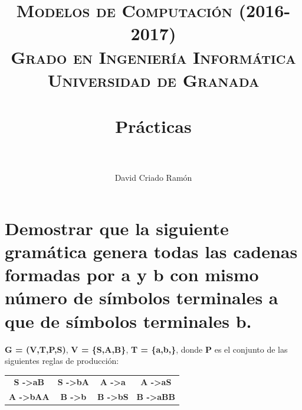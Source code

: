 



\title{	
\normalfont \normalsize 
\textsc{\textbf{Modelos de Computación (2016-2017)} \\ Grado en Ingeniería Informática \\ Universidad de Granada} \\ [25pt] %
\horrule{0.5pt} \\[0.4cm] %
\huge Prácticas \\ %
\horrule{2pt} \\[0.5cm] %
}

\author{David Criado Ramón} %
\date{}




\maketitle %

\newpage %

\tableofcontents %

\newpage
\section{Demostrar que la siguiente gramática genera todas las cadenas formadas por a y b con mismo número de símbolos terminales a que de símbolos terminales b.}
\textbf{G = (V,T,P,S)}, \textbf{V = \{S,A,B\}}, \textbf {T = \{a,b,\}}, donde \textbf{P} es el conjunto de las siguientes reglas de producción: \newline

\begin{table}[H]
	\centering
	\begin{tabular}{cccc}
		\textbf{S -\textgreater\space aB}  & \textbf{S -\textgreater\space bA} & \textbf{A -\textgreater\space a}  & \textbf{A -\textgreater\space aS}  \\
		\textbf{A -\textgreater\space bAA} & \textbf{B -\textgreater\space b}  & \textbf{B -\textgreater\space bS} & \textbf{B -\textgreater\space aBB}
	\end{tabular}
\end{table}


